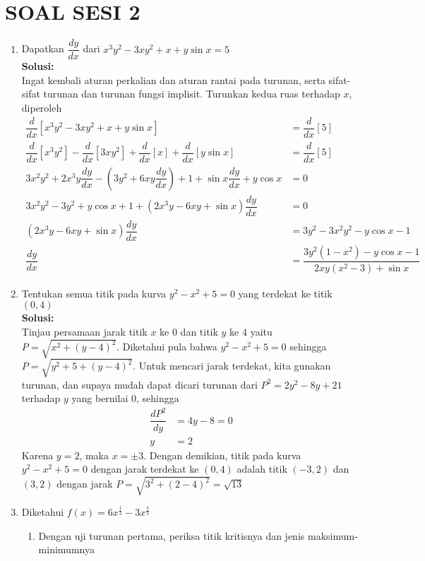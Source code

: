 \documentclass{article}
\begin{document}
\section*{SOAL SESI 2}
\begin{enumerate}
	\item Dapatkan $\dfrac{dy}{dx}$ dari $x^3y^2-3xy^2+x+y\sin x =5$
	\\[0.1 cm] \textbf{Solusi:}\\
	Ingat kembali aturan perkalian dan aturan rantai pada turunan, serta sifat-sifat turunan dan turunan fungsi implisit. Turunkan kedua ruas terhadap $x$, diperoleh
	\begin{align*}
	\dfrac{d}{dx}[x^3y^2-3xy^2+x+y\sin x] &= \dfrac{d}{dx}[5] \\
	\dfrac{d}{dx}[x^3y^2]-\dfrac{d}{dx}[3xy^2]+\dfrac{d}{dx}[x] +\dfrac{d}{dx}[y\sin x] &= \dfrac{d}{dx} [5] \\
	3x^2y^2+2x^3y\dfrac{dy}{dx}-\left(3y^2+6xy\dfrac{dy}{dx}\right) + 1 + \sin x\dfrac{dy}{dx} +y\cos x &= 0 \\
	3x^2y^2-3y^2+y\cos x+1 + \left(2x^3y-6xy+\sin x\right)\dfrac{dy}{dx} &= 0 \\
	\left(2x^3y-6xy+\sin x\right)\dfrac{dy}{dx} &= 3y^2-3x^2y^2-y\cos x -1 \\
	\dfrac{dy}{dx} &= \dfrac{3y^2(1-x^2)-y\cos x -1}{2xy(x^2-3)+\sin x}
	\end{align*}
	\item Tentukan semua titik pada kurva $y^2-x^2+5=0$ yang terdekat ke titik $(0,4)$
	\\[0.1 cm] \textbf{Solusi:}\\
	Tinjau persamaan jarak titik $x$ ke $0$ dan titik $y$ ke $4$ yaitu $P=\sqrt{x^2+(y-4)^2}$. Diketahui pula bahwa $y^2-x^2+5=0$ sehingga $P=\sqrt{y^2+5+(y-4)^2}$. Untuk mencari jarak terdekat, kita gunakan turunan, dan supaya mudah dapat dicari turunan dari $P^2=2y^2-8y+21$ terhadap $y$ yang bernilai 0, sehingga 
	 \begin{align*}
	 \dfrac{dP^2}{dy} &= 4y-8 = 0 \\
	 y &= 2
	 \end{align*}
	 Karena $y=2$, maka $x=\pm 3$. Dengan demikian, titik pada kurva $y^2-x^2+5=0$ dengan jarak terdekat ke $(0,4)$ adalah titik $(-3,2)$ dan $(3,2)$ dengan jarak $P=\sqrt{3^2+(2-4)^2}=\sqrt{13}$
	 \item Diketahui $f(x)=6x^{\frac{1}{3}}-3x^{\frac{4}{3}}$
	 \begin{enumerate}
	 	\item Dengan uji turunan pertama, periksa titik kritisnya dan jenis maksimum-minimumnya

\end{enumerate}
\end{enumerate}
\end{document}
